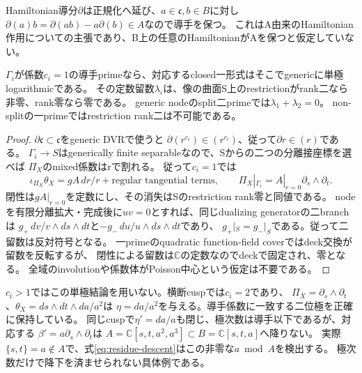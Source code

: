 Hamiltonian導分$\partial$は正規化へ延び、$a\in\mathfrak c,b\in B$に対し
$\partial(a)b=\partial(ab)-a\partial(b)\in A$なので導手を保つ。
これはA由来のHamiltonian作用についての主張であり、B上の任意のHamiltonianがAを保つと仮定していない。

\begin{proposition}[導手係数一の留数とnodeの符号]\label{prop:conductor-pole-residue}
$\Gamma_i$が係数$c_i=1$の導手primeなら、対応するclosed一形式はそこでgenericに単極logarithmicである。
その定数留数$\lambda_i$は、像の曲面S上のrestrictionがrank二なら非零、rank零なら零である。
generic nodeのsplit二primeでは$\lambda_1+\lambda_2=0$。
non-splitの一primeではrestriction rank二は不可能である。
\end{proposition}
\begin{proof}
$\partial\mathfrak c\subset\mathfrak c$をgeneric DVRで使うと
$\partial(r^{c_i})\in(r^{c_i})$、従って$\partial r\in(r)$である。
$\Gamma_i\to S$はgenerically finite separableなので、Sからの二つの分離接座標を選べば
$\Pi_X$のmixed係数はrで割れる。
従って$c_i=1$では
\[
 \iota_{\Pi_X}\theta_X=gA\,dr/r+\text{regular tangential terms},
 \qquad\Pi_X|_{\Gamma_i}=A|_{r=0}\partial_s\wedge\partial_t .
\]
閉性は$gA|_{r=0}$を定数にし、その消失はSのrestriction rank零と同値である。
nodeを有限分離拡大・完成後に$uv=0$とすれば、同じdualizing generatorの二branchは
$g_+\,dv/v\wedge ds\wedge dt$と$-g_-\,du/u\wedge ds\wedge dt$であり、
$g_+|_S=g_-|_S$である。従って二留数は反対符号となる。
一primeのquadratic function-field coverではdeck交換が留数を反転するが、
閉性による留数は$\mathbb C$の定数なのでdeckで固定され、零となる。
全域のinvolutionや係数体がPoisson中心という仮定は不要である。
\end{proof}
$c_i>1$ではこの単極結論を用いない。横断cuspでは$c_i=2$であり、
$\Pi_X=\partial_s\wedge\partial_t$、$\theta_X=ds\wedge dt\wedge da/a^2$は
$\eta=da/a^2$を与える。導手係数に一致する二位極を正確に保持している。
同じcuspで$\eta'=da/a$も閉じ、極次数は導手以下であるが、対応する
$\beta'=a\partial_s\wedge\partial_t$は
$A=\mathbb C[s,t,a^2,a^3]\subset B=\mathbb C[s,t,a]$へ降りない。
実際$\{s,t\}=a\notin A$で、式\eqref{eq:residue-descent}はこの非零な$a\bmod A$を検出する。
極次数だけで降下を済ませられない具体例である。


